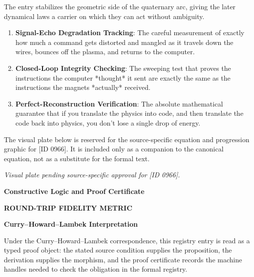 The entry stabilizes the geometric side of the quaternary arc, giving the later dynamical laws a carrier on which they can act without ambiguity.
\endgroup

\begin{enumerate}[leftmargin=1.6em,itemsep=6pt,topsep=4pt]
\item \textbf{Signal-Echo Degradation Tracking}: The careful measurement of exactly how much a command gets distorted and mangled as it travels down the wires, bounces off the plasma, and returns to the computer.
\item \textbf{Closed-Loop Integrity Checking}: The sweeping test that proves the instructions the computer *thought* it sent are exactly the same as the instructions the magnets *actually* received.
\item \textbf{Perfect-Reconstruction Verification}: The absolute mathematical guarantee that if you translate the physics into code, and then translate the code back into physics, you don't lose a single drop of energy.
\end{enumerate}

\begingroup\footnotesize\sloppy
The visual plate below is reserved for the source-specific equation and progression graphic for [ID 0966]. It is included only as a companion to the canonical equation, not as a substitute for the formal text.
\par\endgroup
\begingroup\footnotesize\itshape
Visual plate pending source-specific approval for [ID 0966].
\par\endgroup

\clearpage
\begingroup\tzpsupportsetup
\noindent\textbf{\fontsize{10.8pt}{12.8pt}\selectfont [ID 0966] Constructive Logic and Proof Certificate}\par
\noindent\textbf{\fontsize{10pt}{12pt}\selectfont ROUND-TRIP FIDELITY METRIC}\par
\vspace{0.45em}
\begingroup
\footnotesize
\setlength{\parskip}{0.22em}
\setlength{\parindent}{0pt}
\noindent\textbf{Curry--Howard--Lambek Interpretation}\par
Under the Curry--Howard--Lambek correspondence, this registry entry is read as a typed proof
object: the stated source condition supplies the proposition, the derivation supplies the
morphism, and the proof certificate records the machine handles needed to check the obligation
in the formal registry.

